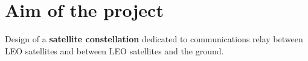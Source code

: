 \section{Aim of the project}
Design of a \textbf{satellite constellation} dedicated to  communications relay between LEO satellites and between LEO satellites and the ground. 
